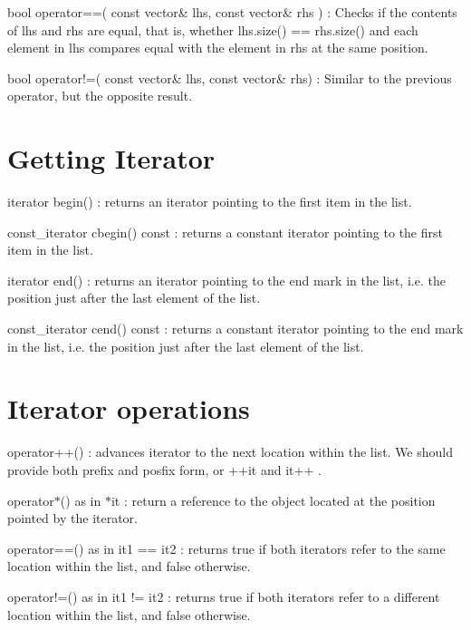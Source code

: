 \begin{DoxyItemize}
\item {\ttfamily bool operator==( const vector\& lhs, const vector\& rhs )} \+: Checks if the contents of lhs and rhs are equal, that is, whether {\ttfamily lhs.\+size() == rhs.\+size()} and each element in lhs compares equal with the element in {\ttfamily rhs} at the same position.
\item {\ttfamily bool operator!=( const vector\& lhs, const vector\& rhs)} \+: Similar to the previous operator, but the opposite result.
\end{DoxyItemize}

\section*{Getting Iterator}


\begin{DoxyItemize}
\item {\ttfamily iterator begin()} \+: returns an {\ttfamily iterator} pointing to the first item in the list.
\item {\ttfamily const\+\_\+iterator cbegin() const} \+: returns a {\ttfamily constant iterator} pointing to the first item in the list.
\item {\ttfamily iterator end()} \+: returns an {\ttfamily iterator} pointing to the end mark in the list, i.\+e. the position just after the last element of the list.
\item {\ttfamily const\+\_\+iterator cend() const} \+: returns a {\ttfamily constant iterator} pointing to the end mark in the list, i.\+e. the position just after the last element of the list.
\end{DoxyItemize}

\section*{Iterator operations}


\begin{DoxyItemize}
\item {\ttfamily operator++()} \+: advances {\ttfamily iterator} to the next location within the list. We should provide both prefix and posfix form, or {\ttfamily ++it} and {\ttfamily it++} .
\item {\ttfamily operator$\ast$()} as in {\ttfamily $\ast$it} \+: return a reference to the object located at the position pointed by the {\ttfamily iterator}.
\item {\ttfamily operator==()} as in it1 == it2 \+: returns true if both {\ttfamily iterators} refer to the same location within the list, and false otherwise.
\item {\ttfamily operator!=()} as in it1 != it2 \+: returns true if both {\ttfamily iterators} refer to a different location within the list, and false otherwise.
\end{DoxyItemize}

